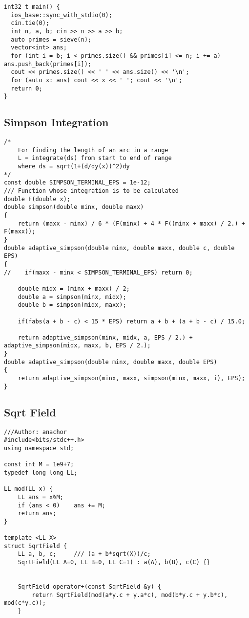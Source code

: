 \documentclass[10pt,a4paper,onesided]{article}
\begin{document}
\begin{multicols*}{3}
\begin{lstlisting}
int32_t main() {
  ios_base::sync_with_stdio(0);
  cin.tie(0);
  int n, a, b; cin >> n >> a >> b;
  auto primes = sieve(n);
  vector<int> ans;
  for (int i = b; i < primes.size() && primes[i] <= n; i += a) ans.push_back(primes[i]);
  cout << primes.size() << ' ' << ans.size() << '\n';
  for (auto x: ans) cout << x << ' '; cout << '\n';
  return 0;
}
\end{lstlisting}
\subsection{Simpson Integration}
\begin{lstlisting}
/*
    For finding the length of an arc in a range
    L = integrate(ds) from start to end of range
    where ds = sqrt(1+(d/dy(x))^2)dy
*/
const double SIMPSON_TERMINAL_EPS = 1e-12;
/// Function whose integration is to be calculated
double F(double x);
double simpson(double minx, double maxx)
{
    return (maxx - minx) / 6 * (F(minx) + 4 * F((minx + maxx) / 2.) + F(maxx));
}
double adaptive_simpson(double minx, double maxx, double c, double EPS)
{
//    if(maxx - minx < SIMPSON_TERMINAL_EPS) return 0;

    double midx = (minx + maxx) / 2;
    double a = simpson(minx, midx);
    double b = simpson(midx, maxx);

    if(fabs(a + b - c) < 15 * EPS) return a + b + (a + b - c) / 15.0;

    return adaptive_simpson(minx, midx, a, EPS / 2.) + adaptive_simpson(midx, maxx, b, EPS / 2.);
}
double adaptive_simpson(double minx, double maxx, double EPS)
{
    return adaptive_simpson(minx, maxx, simpson(minx, maxx, i), EPS);
}

\end{lstlisting}
\subsection{Sqrt Field}
\begin{lstlisting}
///Author: anachor
#include<bits/stdc++.h>
using namespace std;

const int M = 1e9+7;
typedef long long LL;

LL mod(LL x) {
    LL ans = x%M;
    if (ans < 0)    ans += M;
    return ans;
}

template <LL X>
struct SqrtField {
    LL a, b, c;     /// (a + b*sqrt(X))/c;
    SqrtField(LL A=0, LL B=0, LL C=1) : a(A), b(B), c(C) {}


    SqrtField operator+(const SqrtField &y) {
        return SqrtField(mod(a*y.c + y.a*c), mod(b*y.c + y.b*c), mod(c*y.c));
    }


\end{lstlisting}
\end{multicols*}
\end{document}
